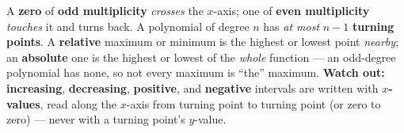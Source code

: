 \documentclass[12pt]{article}
\begin{document}
\vspace{0.14in}

\boxguard[8]
\begin{remindbox}
\small
A \textbf{zero} of \textbf{odd multiplicity} \emph{crosses} the $x$-axis; one of \textbf{even
multiplicity} \emph{touches} it and turns back. A polynomial of degree $n$ has \emph{at most}
$n-1$ \textbf{turning points}. A \textbf{relative} maximum or minimum is the highest or lowest
point \emph{nearby}; an \textbf{absolute} one is the highest or lowest of the \emph{whole}
function --- an odd-degree polynomial has none, so not every maximum is ``the'' maximum.
\textbf{Watch out:} \textbf{increasing}, \textbf{decreasing}, \textbf{positive}, and
\textbf{negative} intervals are written with \textbf{$x$-values}, read along the $x$-axis from
turning point to turning point (or zero to zero) --- never with a turning point's $y$-value.
\end{remindbox}
\end{document}
